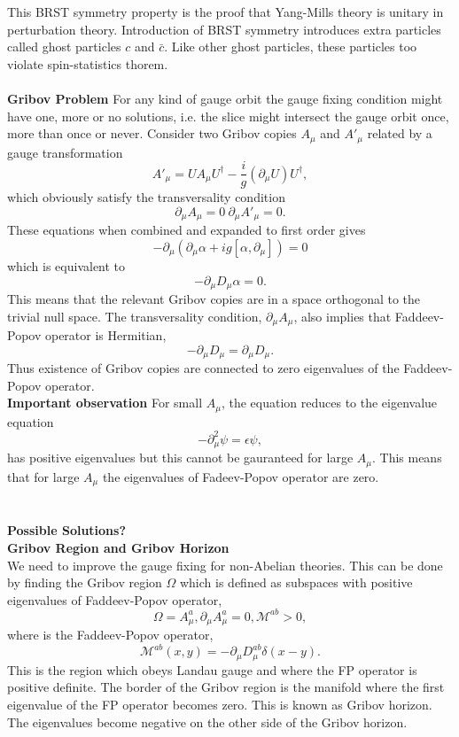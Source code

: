 \begin{description}
This BRST symmetry property is the proof that Yang-Mills theory is unitary in perturbation theory. Introduction of BRST symmetry introduces extra particles called ghost particles $c$ and $\bar{c}$. Like other ghost particles, these particles too violate spin-statistics thorem.
\\
\\
\textbf{Gribov Problem}
For any kind of gauge orbit the gauge fixing condition might have one, more or no solutions, i.e. the slice might intersect the gauge orbit once, more than once or never. Consider two Gribov copies $A_{\mu}$ and $A'_{\mu}$ related by a gauge transformation $$ A'_{\mu}=U A_{\mu} U^{\dagger}-\frac{i}{g}(\partial_{\mu}U)U^{\dagger},$$ which obviously satisfy the transversality condition $$\partial_{\mu}A_{\mu}=0 \ \partial_{\mu}A'_{\mu}=0. $$ These equations when combined and expanded to first order gives $$ -\partial_{\mu}(\partial_{\mu}\alpha+i g [\alpha,\partial_{\mu}])=0 $$ which is equivalent to $$-\partial_{\mu}D_{\mu} \alpha  =0.$$ This means that the relevant Gribov copies are in a space orthogonal to the trivial null space. The transversality condition, $\partial_{\mu}A_{\mu}$, also implies that Faddeev-Popov operator is Hermitian, $$-\partial_{\mu}D_{\mu}=\partial_{\mu}D_{\mu}.$$ Thus existence of Gribov copies are connected to zero eigenvalues of the Faddeev-Popov operator.
\\
\textbf{Important observation}
For small $A_{\mu}$, the equation reduces to the eigenvalue equation $$-\partial^{2}_{\mu}\psi=\epsilon \psi,$$ has positive eigenvalues but this cannot be gauranteed for large $A_{\mu}$. This means that for large $A_{\mu}$ the eigenvalues of Fadeev-Popov operator are zero.
\\
\\
\\
\textbf{Possible Solutions?}\\
\textbf{Gribov Region and Gribov Horizon}\\
We need to improve the gauge fixing for non-Abelian theories. This can be done by finding the Gribov region $\Omega$ which is defined as subspaces with positive eigenvalues of Faddeev-Popov operator, $$\Omega = {A^{a}_{\mu},\partial_{\mu}A^{a}_{\mu}=0, \mathcal{M}^{ab}>0},$$ where  is the Faddeev-Popov operator, $$\mathcal{M}^{ab}(x,y)=-\partial_{\mu}D^{ab}_{\mu}\delta(x-y).$$ This is the region which obeys Landau gauge and where the FP operator is positive definite. The border of the Gribov region is the manifold where the first eigenvalue of the FP operator becomes zero. This is known as Gribov horizon. The eigenvalues become negative on the other side of the Gribov horizon.

\end{description}
